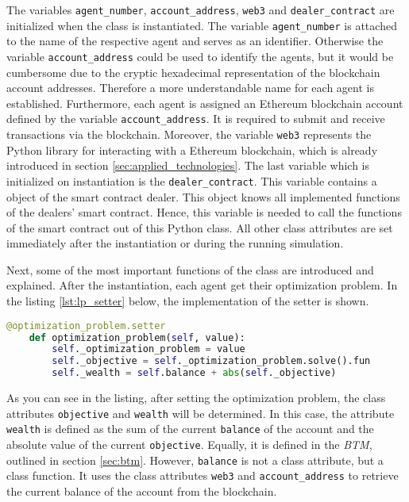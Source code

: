 The variables \verb|agent_number|, \verb|account_address|, \verb|web3| and \verb|dealer_contract| are initialized when the class is instantiated.
The variable \verb|agent_number| is attached to the name of the respective agent and serves as an identifier. 
Otherwise the variable \verb|account_address| could be used to identify the agents, 
but it would be cumbersome due to the cryptic hexadecimal representation of the blockchain account addresses.
Therefore a more understandable name for each agent is established.
Furthermore, each agent is assigned an Ethereum blockchain account defined by the variable \verb|account_address|. It is required to submit and 
receive transactions via the blockchain.
Moreover, the variable \verb|web3| represents the Python library for interacting with a Ethereum blockchain, which is already introduced in section \ref{sec:applied_technologies}.
The last variable which is initialized on instantiation is the \verb|dealer_contract|. 
This variable contains a object of the smart contract dealer. This object knows all implemented functions of the dealers' smart contract.
Hence, this variable is needed to call the functions of the smart contract out of this Python class.
All other class attributes are set immediately after the instantiation or during the running simulation. 

Next, some of the most important functions of the class are introduced and explained.
After the instantiation, each agent get their optimization problem. In the listing \ref{lst:lp_setter} below, the implementation 
of the setter is shown.

\begin{lstlisting}[label=lst:lp_setter, caption=Setter of optimization problem, language=Python]
    @optimization_problem.setter
    def optimization_problem(self, value):
        self._optimization_problem = value
        self._objective = self._optimization_problem.solve().fun
        self._wealth = self.balance + abs(self._objective)
\end{lstlisting}

As you can see in the listing, after setting the optimization problem, the class attributes \verb|objective| and \verb|wealth| will be determined.
In this case, the attribute \verb|wealth| is defined as the sum of the current \verb|balance| of the account and the absolute value of the current \verb|objective|.
Equally, it is defined in the \textit{BTM}, outlined in section \ref{sec:btm}.
However, \verb|balance| is not a class attribute, but a class function. It uses the class attributes \verb|web3| and \verb|account_address| to retrieve the current
balance of the account from the blockchain.


